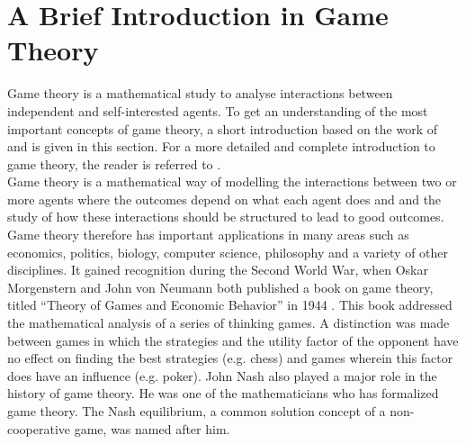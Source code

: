 \section{A Brief Introduction in Game Theory}
\label{Cha1:briefintro}
Game theory is a mathematical study to analyse interactions between independent and self-interested agents. To get an understanding of the most important concepts of game theory, a short introduction based on the work of 
\cite{leyton2008essentials} and \cite{Coursera} is given in this section. For a more detailed and complete introduction to game theory, the reader is referred to 
\cite{leyton2008essentials}.  \\
Game theory is a mathematical way of modelling the interactions between two or more agents where the outcomes depend on what each agent does and and the study of how these interactions should be structured to lead to good outcomes. Game theory therefore has important applications in many areas such as economics, politics, biology, computer science, philosophy and a variety of other disciplines. It gained recognition during the Second World War, when Oskar Morgenstern and John von Neumann both published a book on game theory, titled ``Theory of Games and Economic Behavior'' in 1944 \cite{von1944theory}. This book addressed the mathematical analysis of a series of thinking games. A distinction was made between games in which the strategies and the utility factor of the opponent have no effect on finding the best strategies (e.g. chess) and games wherein this factor does have an influence (e.g. poker). John Nash also played a major role in the history of game theory. He was one of the mathematicians who has formalized game theory. The Nash equilibrium, a common solution concept of a non-cooperative game, was named after him.
~~\\

